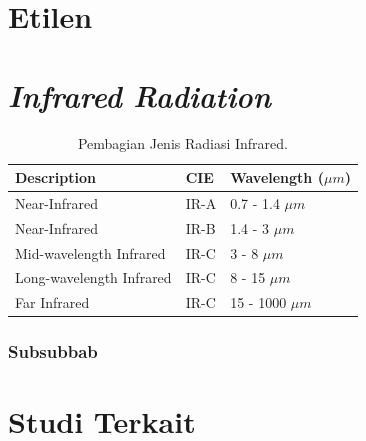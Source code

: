 	\section{Etilen}
	
	\section{\textit{Infrared Radiation}}
	\begin{table}[!htbp]
		\small
		\centering
		\caption{Pembagian Jenis Radiasi Infrared.}
		\label{tabel1}
		\begin{tabular}{|p{5.0cm}|p{2cm}|p{3.5cm}|}
		\hline
		\textbf{Description }	& \textbf{CIE }	& \textbf{Wavelength ($\mu m$)} \\
		\hline
		Near-Infrared				& IR-A	& 0.7  - 1.4 $\mu m$\\
		Near-Infrared				& IR-B	& 1.4  - 3 $\mu m$ \\
		Mid-wavelength Infrared		& IR-C	& 3 - 8 $\mu m$ \\
		Long-wavelength Infrared	& IR-C	& 8 - 15 $\mu m$ \\
		Far Infrared				& IR-C	& 15 - 1000 $\mu m$ \\
		\hline
		\end{tabular}
	\end{table}
	\vspace{-0.5cm}
    \subsubsection{Subsubbab}

    \blindtext

\section{Studi Terkait}
\blindtext
